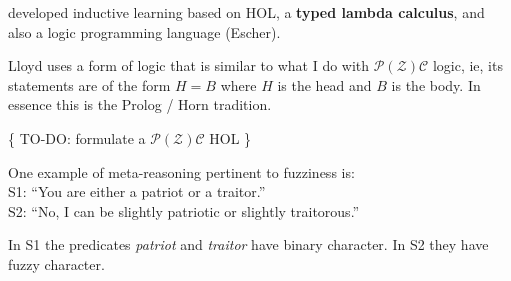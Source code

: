 \citep*{Lloyd2003} developed inductive learning based on HOL, a \textbf{typed lambda calculus}, and also a logic programming language (Escher).

Lloyd uses a form of logic that is similar to what I do with $\mathcal{P(Z)C}$ logic, ie, its statements are of the form $H = B$ where $H$ is the head and $B$ is the body.  In essence this is the Prolog / Horn tradition.

\{ TO-DO:  formulate a $\mathcal{P(Z)C}$ HOL \}

\label{sec:PZ-meta-reasoning}

One example of meta-reasoning pertinent to fuzziness is:\\
\hspace*{1cm} S1: ``You are either a patriot or a traitor.''\\
\hspace*{1cm} S2: ``No, I can be slightly patriotic or slightly traitorous.''

In S1 the predicates \textit{patriot} and \textit{traitor} have binary character.  In S2 they have fuzzy character.
